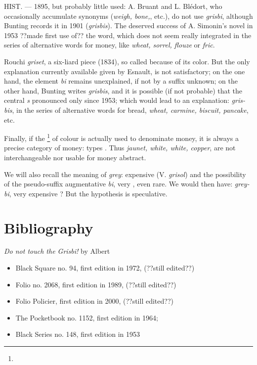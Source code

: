 HIST. --- 1895, but probably little used: A. Bruant and L. Blédort, who
occasionally accumulate synonyms (\emph{weigh, bone,}, etc.), do not use \emph{grisbi}, although Bunting records it in 1901 (\emph{grisbis}). The deserved success of A. Simonin's novel in 1953 ??made first use of?? the word, which does not seem really integrated in the series of alternative words for money, like \emph{wheat, sorrel, flouze} or \emph{fric}.

Rouchi \emph{griset}, \og a six-liard piece \fg{} (1834), so called because of its color. But the only explanation currently available given by Esnault,  is not satisfactory; on the one hand, the element \emph{bi} remains
unexplained, if not by a \og suffix \fg{} unknown; on the other hand, Bunting writes
\emph{grisbis}, and it is possible (if not probable) that the central \emph{s}
pronounced only since 1953; which would lead to an explanation:
\emph{gris-bis}, in the series of alternative words for bread,
\emph{wheat, carmine, biscuit, pancake}, etc.

Finally, if the \footnote{\urlMetonym{}} of colour is actually used to denominate
money, it is always a precise category of money: \og types \fg{}.
Thus \emph{jaunet, white, white, copper}, are not interchangeable nor
usable for \og money \fg{} abstract.

We will also recall the meaning of \emph{grey}: \og expensive \fg{} (V. \emph{grisol}) and the possibility of the pseudo-suffix augmentative \emph{bi}, \og very \fg{} , even rare. We would then have: \emph{grey-bi}, \og very expensive \fg{}? But the hypothesis is speculative.

\section*{Bibliography}

\emph{Do not touch the Grisbi!} by Albert 

\begin{itemize}
\item Black Square no. 94, first edition in 1972, (??still edited??)
\item Folio no. 2068, first edition in 1989, (??still edited??)
\item Folio Policier, first edition in 2000, (??still edited??)
\item The Pocketbook no. 1152, first edition in 1964;
\item Black Series no. 148, first edition in 1953

\end{itemize}

